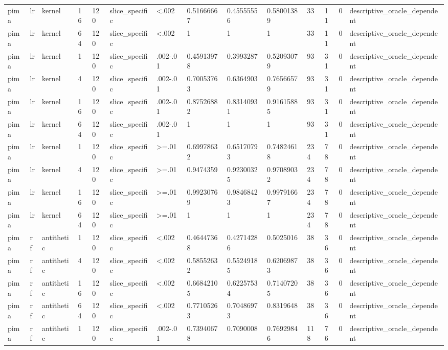 \begin{tabular}{llllllllllllll}
pima & lr & kernel & 16 & 120 & slice\_specific & <.002 & 0.51666667 & 0.45555556 & 0.58001389 & 33 & 11 & 0 & descriptive\_oracle\_dependent \\
pima & lr & kernel & 64 & 120 & slice\_specific & <.002 & 1 & 1 & 1 & 33 & 11 & 0 & descriptive\_oracle\_dependent \\
pima & lr & kernel & 1 & 120 & slice\_specific & .002-.01 & 0.45913978 & 0.3993287 & 0.52093079 & 93 & 31 & 0 & descriptive\_oracle\_dependent \\
pima & lr & kernel & 4 & 120 & slice\_specific & .002-.01 & 0.70053763 & 0.6364903 & 0.76566579 & 93 & 31 & 0 & descriptive\_oracle\_dependent \\
pima & lr & kernel & 16 & 120 & slice\_specific & .002-.01 & 0.87526882 & 0.83140931 & 0.91615885 & 93 & 31 & 0 & descriptive\_oracle\_dependent \\
pima & lr & kernel & 64 & 120 & slice\_specific & .002-.01 & 1 & 1 & 1 & 93 & 31 & 0 & descriptive\_oracle\_dependent \\
pima & lr & kernel & 1 & 120 & slice\_specific & >=.01 & 0.69978632 & 0.65170793 & 0.74824618 & 234 & 78 & 0 & descriptive\_oracle\_dependent \\
pima & lr & kernel & 4 & 120 & slice\_specific & >=.01 & 0.9474359 & 0.92300325 & 0.97089032 & 234 & 78 & 0 & descriptive\_oracle\_dependent \\
pima & lr & kernel & 16 & 120 & slice\_specific & >=.01 & 0.99230769 & 0.98468423 & 0.99791667 & 234 & 78 & 0 & descriptive\_oracle\_dependent \\
pima & lr & kernel & 64 & 120 & slice\_specific & >=.01 & 1 & 1 & 1 & 234 & 78 & 0 & descriptive\_oracle\_dependent \\
pima & rf & antithetic & 1 & 120 & slice\_specific & <.002 & 0.46447368 & 0.42714286 & 0.5025016 & 38 & 36 & 0 & descriptive\_oracle\_dependent \\
pima & rf & antithetic & 4 & 120 & slice\_specific & <.002 & 0.58552632 & 0.55249185 & 0.62069873 & 38 & 36 & 0 & descriptive\_oracle\_dependent \\
pima & rf & antithetic & 16 & 120 & slice\_specific & <.002 & 0.66842105 & 0.62257534 & 0.71407205 & 38 & 36 & 0 & descriptive\_oracle\_dependent \\
pima & rf & antithetic & 64 & 120 & slice\_specific & <.002 & 0.77105263 & 0.70486973 & 0.8319648 & 38 & 36 & 0 & descriptive\_oracle\_dependent \\
pima & rf & antithetic & 1 & 120 & slice\_specific & .002-.01 & 0.73940678 & 0.7090008 & 0.76929846 & 118 & 76 & 0 & descriptive\_oracle\_dependent \\

\end{tabular}
